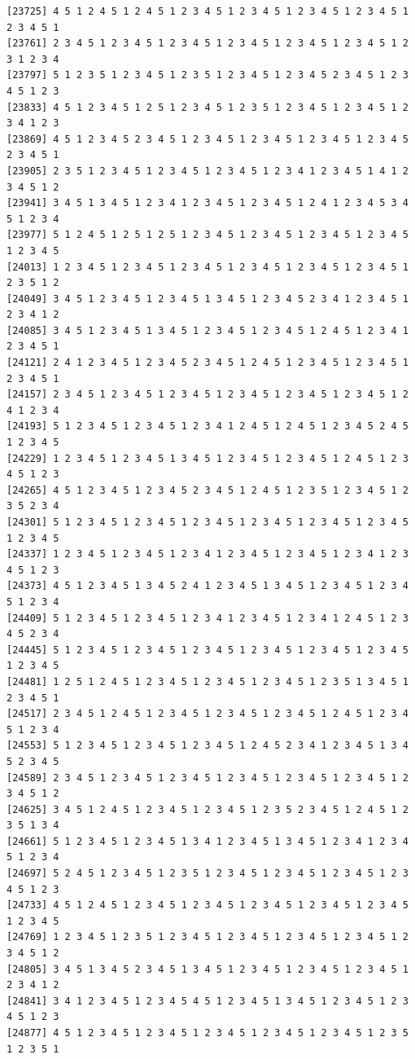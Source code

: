 \documentclass[
  11pt,
]{book}
\begin{document}
\begin{verbatim}
[23725] 4 5 1 2 4 5 1 2 4 5 1 2 3 4 5 1 2 3 4 5 1 2 3 4 5 1 2 3 4 5 1 2 3 4 5 1
[23761] 2 3 4 5 1 2 3 4 5 1 2 3 4 5 1 2 3 4 5 1 2 3 4 5 1 2 3 4 5 1 2 3 1 2 3 4
[23797] 5 1 2 3 5 1 2 3 4 5 1 2 3 5 1 2 3 4 5 1 2 3 4 5 2 3 4 5 1 2 3 4 5 1 2 3
[23833] 4 5 1 2 3 4 5 1 2 5 1 2 3 4 5 1 2 3 5 1 2 3 4 5 1 2 3 4 5 1 2 3 4 1 2 3
[23869] 4 5 1 2 3 4 5 2 3 4 5 1 2 3 4 5 1 2 3 4 5 1 2 3 4 5 1 2 3 4 5 2 3 4 5 1
[23905] 2 3 5 1 2 3 4 5 1 2 3 4 5 1 2 3 4 5 1 2 3 4 1 2 3 4 5 1 4 1 2 3 4 5 1 2
[23941] 3 4 5 1 3 4 5 1 2 3 4 1 2 3 4 5 1 2 3 4 5 1 2 4 1 2 3 4 5 3 4 5 1 2 3 4
[23977] 5 1 2 4 5 1 2 5 1 2 5 1 2 3 4 5 1 2 3 4 5 1 2 3 4 5 1 2 3 4 5 1 2 3 4 5
[24013] 1 2 3 4 5 1 2 3 4 5 1 2 3 4 5 1 2 3 4 5 1 2 3 4 5 1 2 3 4 5 1 2 3 5 1 2
[24049] 3 4 5 1 2 3 4 5 1 2 3 4 5 1 3 4 5 1 2 3 4 5 2 3 4 1 2 3 4 5 1 2 3 4 1 2
[24085] 3 4 5 1 2 3 4 5 1 3 4 5 1 2 3 4 5 1 2 3 4 5 1 2 4 5 1 2 3 4 1 2 3 4 5 1
[24121] 2 4 1 2 3 4 5 1 2 3 4 5 2 3 4 5 1 2 4 5 1 2 3 4 5 1 2 3 4 5 1 2 3 4 5 1
[24157] 2 3 4 5 1 2 3 4 5 1 2 3 4 5 1 2 3 4 5 1 2 3 4 5 1 2 3 4 5 1 2 4 1 2 3 4
[24193] 5 1 2 3 4 5 1 2 3 4 5 1 2 3 4 1 2 4 5 1 2 4 5 1 2 3 4 5 2 4 5 1 2 3 4 5
[24229] 1 2 3 4 5 1 2 3 4 5 1 3 4 5 1 2 3 4 5 1 2 3 4 5 1 2 4 5 1 2 3 4 5 1 2 3
[24265] 4 5 1 2 3 4 5 1 2 3 4 5 2 3 4 5 1 2 4 5 1 2 3 5 1 2 3 4 5 1 2 3 5 2 3 4
[24301] 5 1 2 3 4 5 1 2 3 4 5 1 2 3 4 5 1 2 3 4 5 1 2 3 4 5 1 2 3 4 5 1 2 3 4 5
[24337] 1 2 3 4 5 1 2 3 4 5 1 2 3 4 1 2 3 4 5 1 2 3 4 5 1 2 3 4 1 2 3 4 5 1 2 3
[24373] 4 5 1 2 3 4 5 1 3 4 5 2 4 1 2 3 4 5 1 3 4 5 1 2 3 4 5 1 2 3 4 5 1 2 3 4
[24409] 5 1 2 3 4 5 1 2 3 4 5 1 2 3 4 1 2 3 4 5 1 2 3 4 1 2 4 5 1 2 3 4 5 2 3 4
[24445] 5 1 2 3 4 5 1 2 3 4 5 1 2 3 4 5 1 2 3 4 5 1 2 3 4 5 1 2 3 4 5 1 2 3 4 5
[24481] 1 2 5 1 2 4 5 1 2 3 4 5 1 2 3 4 5 1 2 3 4 5 1 2 3 5 1 3 4 5 1 2 3 4 5 1
[24517] 2 3 4 5 1 2 4 5 1 2 3 4 5 1 2 3 4 5 1 2 3 4 5 1 2 4 5 1 2 3 4 5 1 2 3 4
[24553] 5 1 2 3 4 5 1 2 3 4 5 1 2 3 4 5 1 2 4 5 2 3 4 1 2 3 4 5 1 3 4 5 2 3 4 5
[24589] 2 3 4 5 1 2 3 4 5 1 2 3 4 5 1 2 3 4 5 1 2 3 4 5 1 2 3 4 5 1 2 3 4 5 1 2
[24625] 3 4 5 1 2 4 5 1 2 3 4 5 1 2 3 4 5 1 2 3 5 2 3 4 5 1 2 4 5 1 2 3 5 1 3 4
[24661] 5 1 2 3 4 5 1 2 3 4 5 1 3 4 1 2 3 4 5 1 3 4 5 1 2 3 4 1 2 3 4 5 1 2 3 4
[24697] 5 2 4 5 1 2 3 4 5 1 2 3 5 1 2 3 4 5 1 2 3 4 5 1 2 3 4 5 1 2 3 4 5 1 2 3
[24733] 4 5 1 2 4 5 1 2 3 4 5 1 2 3 4 5 1 2 3 4 5 1 2 3 4 5 1 2 3 4 5 1 2 3 4 5
[24769] 1 2 3 4 5 1 2 3 5 1 2 3 4 5 1 2 3 4 5 1 2 3 4 5 1 2 3 4 5 1 2 3 4 5 1 2
[24805] 3 4 5 1 3 4 5 2 3 4 5 1 3 4 5 1 2 3 4 5 1 2 3 4 5 1 2 3 4 5 1 2 3 4 1 2
[24841] 3 4 1 2 3 4 5 1 2 3 4 5 4 5 1 2 3 4 5 1 3 4 5 1 2 3 4 5 1 2 3 4 5 1 2 3
[24877] 4 5 1 2 3 4 5 1 2 3 4 5 1 2 3 4 5 1 2 3 4 5 1 2 3 4 5 1 2 3 5 1 2 3 5 1

\end{verbatim}
\end{document}
